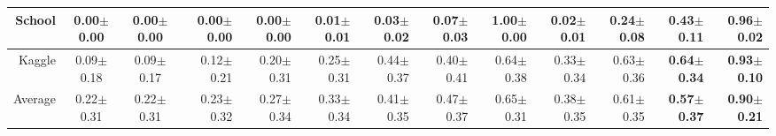 \begin{table*}[]
\begin{tabular}{r|c|c|rr|rr|rr|rr|rr}
\toprule
School & 0.00$\pm$0.00&   0.00$\pm$0.00&   0.00$\pm$0.00 & 0.00$\pm$0.00 & 0.01$\pm$0.01& 0.03$\pm$0.02 & 0.07$\pm$0.03&  \textbf{1.00$\pm$0.00} & 0.02$\pm$0.01 & 0.24$\pm$0.08 & \textbf{0.43$\pm$0.11}& 0.96$\pm$0.02\\
\toprule
Kaggle & 0.09$\pm$0.18&   0.09$\pm$0.17&   0.12$\pm$0.21 &  0.20$\pm$0.31 &  0.25$\pm$0.31& 0.44$\pm$0.37 &  0.40$\pm$0.41&  0.64$\pm$0.38 &  0.33$\pm$0.34 & 0.63$\pm$0.36 &  \textbf{0.64$\pm$0.34}& \textbf{0.93$\pm$0.10}\\
\toprule
Average &    0.22$\pm$0.31&   0.22$\pm$0.31&   0.23$\pm$0.32&  0.27$\pm$0.34&  0.33$\pm$0.34&  0.41$\pm$0.35 &  0.47$\pm$0.37&       0.65$\pm$0.31&    0.38$\pm$0.35&    0.61$\pm$0.35 & \textbf{0.57$\pm$0.37} & \textbf{0.90$\pm$0.21} \\
\end{tabular}
\end{table*}